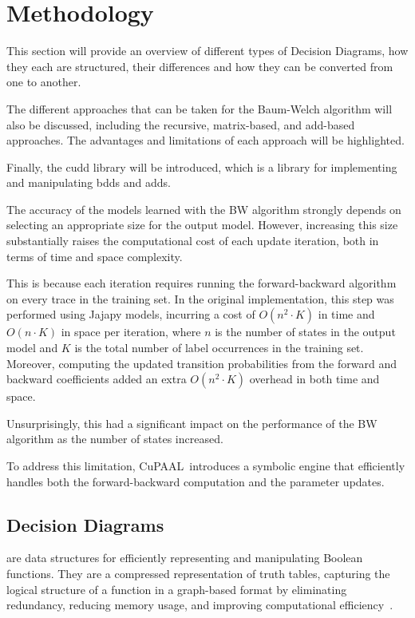 \section{Methodology}\label{sec:methodology}
This section will provide an overview of different types of Decision Diagrams, how they each are structured, their differences and how they can be converted from one to another.

The different approaches that can be taken for the Baum-Welch algorithm will also be discussed, including the recursive, matrix-based, and \gls{add}-based approaches. The advantages and limitations of each approach will be highlighted.

Finally, the \gls{cudd} library will be introduced, which is a library for implementing and manipulating \glspl{bdd} and \glspl{add}.

The accuracy of the models learned with the BW algorithm strongly depends on selecting an appropriate size for the output model. However, increasing this size substantially raises the computational cost of each update iteration, both in terms of time and space complexity.

This is because each iteration requires running the forward-backward algorithm on every trace in the training set. In the original implementation, this step was performed using Jajapy models, incurring a cost of $O(n^2 \cdot K)$ in time and $O(n \cdot K)$ in space per iteration, where $n$ is the number of states in the output model and $K$ is the total number of label occurrences in the training set. Moreover, computing the updated transition probabilities from the forward and backward coefficients added an extra $O(n^2 \cdot K)$ overhead in both time and space.

Unsurprisingly, this had a significant impact on the performance of the BW algorithm as the number of states increased.

To address this limitation, CuPAAL\ introduces a symbolic engine that efficiently handles both the forward-backward computation and the parameter updates.

\subsection{Decision Diagrams}\label{subsec:decision-diagrams}
 are data structures for efficiently representing and manipulating Boolean functions.
They are a compressed representation of truth tables, capturing the logical structure of a function in a graph-based format by eliminating redundancy, reducing memory usage, and improving computational efficiency~\cite{bryant1986graph}.

